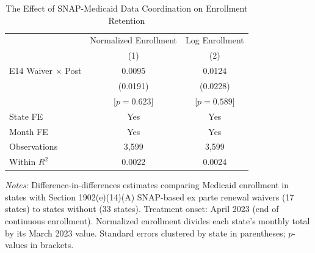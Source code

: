 \begin{table}[t]
\centering
\caption{The Effect of SNAP-Medicaid Data Coordination on Enrollment Retention}
\label{tab:main}
\small
\begin{tabular}{lcc}
\toprule
 & Normalized Enrollment & Log Enrollment \\
 & (1) & (2) \\
\midrule
E14 Waiver $\times$ Post & 0.0095 & 0.0124 \\
 & (0.0191) & (0.0228) \\
 & [$p = 0.623$] & [$p = 0.589$] \\
\midrule
State FE & Yes & Yes \\
Month FE & Yes & Yes \\
Observations & 3,599 & 3,599 \\
Within $R^2$ & 0.0022 & 0.0024 \\
\bottomrule
\end{tabular}
\begin{tablenotes}
\item \textit{Notes:} Difference-in-differences estimates comparing Medicaid enrollment in states with Section 1902(e)(14)(A) SNAP-based ex parte renewal waivers (17 states) to states without (33 states). Treatment onset: April 2023 (end of continuous enrollment). Normalized enrollment divides each state's monthly total by its March 2023 value. Standard errors clustered by state in parentheses; $p$-values in brackets.
\end{tablenotes}
\end{table}

